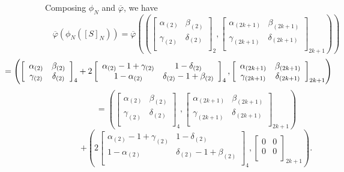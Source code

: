 \documentclass[12pt]{iopart}
\begin{document}
Composing
\(\phi_N\) and \(\overline\varphi\), we have
\[
\overline\varphi(\phi_N([S]_N))=
\overline\varphi(
\left(
\left[\begin{array}{cc}
\alpha_{(2)} & \beta_{(2)} \\
\gamma_{(2)} & \delta_{(2)} \\
\end{array}\right]_2,
\left[\begin{array}{cc}
\alpha_{(2k+1)} & \beta_{(2k+1)} \\
\gamma_{(2k+1)} & \delta_{(2k+1)} \\
\end{array}\right]_{2k+1}
\right)
)
\]
\[
\hspace{-23mm}
=
\left(
\left[\begin{array}{cc}
\alpha_{(2)} & \beta_{(2)} \\
\gamma_{(2)} & \delta_{(2)} \\
\end{array}\right]_4
+
2\left[\begin{array}{cc}
\alpha_{(2)}-1+\gamma_{(2)} & 1-\delta_{(2)} \\
1-\alpha_{(2)} & \delta_{(2)}-1+\beta_{(2)} \\
\end{array}\right]_4
,
\left[\begin{array}{cc}
\alpha_{(2k+1)} & \beta_{(2k+1)} \\
\gamma_{(2k+1)} & \delta_{(2k+1)} \\
\end{array}\right]_{2k+1}\right)
\]
\[
=
\left(
\left[\begin{array}{cc}
\alpha_{(2)} & \beta_{(2)} \\
\gamma_{(2)} & \delta_{(2)} \\
\end{array}\right]_4
,
\left[\begin{array}{cc}
\alpha_{(2k+1)} & \beta_{(2k+1)} \\
\gamma_{(2k+1)} & \delta_{(2k+1)} \\
\end{array}\right]_{2k+1}\right)
\]
\begin{equation}
+
\left(
2\left[\begin{array}{cc}
\alpha_{(2)}-1+\gamma_{(2)} & 1-\delta_{(2)} \\
1-\alpha_{(2)} & \delta_{(2)}-1+\beta_{(2)} \\
\end{array}\right]_4,
\left[\begin{array}{cc}
0 & 0 \\
0 & 0 \\
\end{array}\right]_{2k+1}
\right).
\end{equation}
\end{document}
